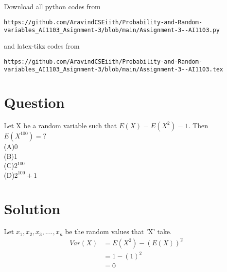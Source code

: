 \documentclass[journal,12pt,twocolumn]{IEEEtran}
\begin{document}
\maketitle
\newpage
\bigskip
\renewcommand{\thefigure}{\theenumi}
\renewcommand{\thetable}{\theenumi}
Download all python codes from 
%
\begin{lstlisting}
https://github.com/AravindCSEiith/Probability-and-Random-variables_AI1103_Asignment-3/blob/main/Assignment-3--AI1103.py
\end{lstlisting}
and latex-tikz codes from 
%
\begin{lstlisting}
https://github.com/AravindCSEiith/Probability-and-Random-variables_AI1103_Asignment-3/blob/main/Assignment-3--AI1103.tex
\end{lstlisting}

\section*{Question}
Let X be a random variable such that $E(X)=E(X^2)=1$. Then $E(X^{100})=?$\\
(A)0\\
(B)1\\
(C)$2^{100}$\\
(D)$2^{100}+1$
\section*{Solution}
Let $x_1,x_2,x_3,....,x_n$ be the random values that 'X' take.
\begin{align}
    Var(X) &=E(X^2)-(E(X))^2\\
     &=1-(1)^2 \\
     &=0
\end{align}
\end{document}
